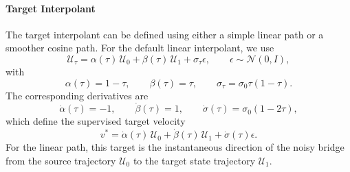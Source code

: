 \paragraph{Target Interpolant}
The target interpolant can be defined using either a simple linear path or a smoother cosine path. For the default linear interpolant, we use
\begin{equation}
    \mathcal{U}_\tau = \alpha(\tau)\,\mathcal{U}_0 + \beta(\tau)\,\mathcal{U}_1 + \sigma_\tau\epsilon,
    \qquad
    \epsilon\sim\mathcal{N}(0,I),
    \label{eq:conditional_stochastic_interpolant_path}
\end{equation}
with
\begin{equation}\label{eq:csi_linear_path}
    \alpha(\tau)=1-\tau,\qquad \beta(\tau)=\tau,\qquad
    \sigma_\tau=\sigma_0\tau(1-\tau).
\end{equation}
The corresponding derivatives are
\begin{equation}
    \dot{\alpha}(\tau)=-1,\qquad \dot{\beta}(\tau)=1,\qquad
    \dot{\sigma}(\tau)=\sigma_0(1-2\tau),
\end{equation}
which define the supervised target velocity
\begin{equation}
    v^{*}
    =
    \dot{\alpha}(\tau)\,\mathcal{U}_0+\dot{\beta}(\tau)\,\mathcal{U}_1+\dot{\sigma}(\tau)\epsilon.
    \label{eq:conditional_stochastic_interpolant_velocity_target}
\end{equation}
For the linear path, this target is the instantaneous direction of the noisy bridge from the source trajectory $\mathcal{U}_0$ to the target state trajectory $\mathcal{U}_1$.

